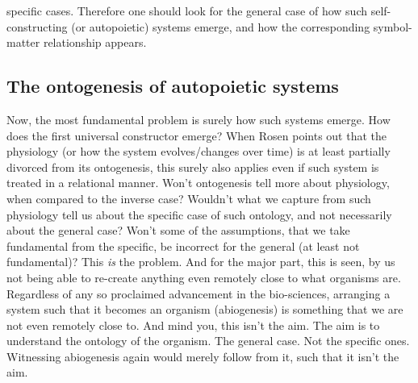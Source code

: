 \documentclass[a4paper,12pt,twoside,leqno]{article}
\begin{document}
specific cases. Therefore one should look for the general case of how such self-constructing (or autopoietic) systems emerge, and how the corresponding symbol-matter relationship appears.  
\subsection*{The ontogenesis of autopoietic systems}
Now, the most fundamental problem is surely how such systems emerge. How does the first universal constructor emerge? When Rosen points out that the physiology (or how the system evolves/changes over time) is at least partially divorced from its ontogenesis, this surely also applies even if such system is treated in a relational manner. Won't ontogenesis tell more about physiology, when compared to the inverse case? Wouldn't what we capture from such physiology tell us about the specific case of such ontology, and not necessarily about the general case? Won't some of the assumptions, that we take fundamental from the specific, be incorrect for the general (at least not fundamental)? This \textit{is} the problem. And for the major part, this is seen, by us not being able to re-create anything even remotely close to what organisms are. Regardless of any so proclaimed advancement in the bio-sciences, arranging a system such that it becomes an organism (abiogenesis) is something that we are not even remotely close to. And mind you, this isn't the aim. The aim is to understand the ontology of the organism. The general case. Not the specific ones. Witnessing abiogenesis again would merely follow from it, such that it isn't the aim.
\end{document}
